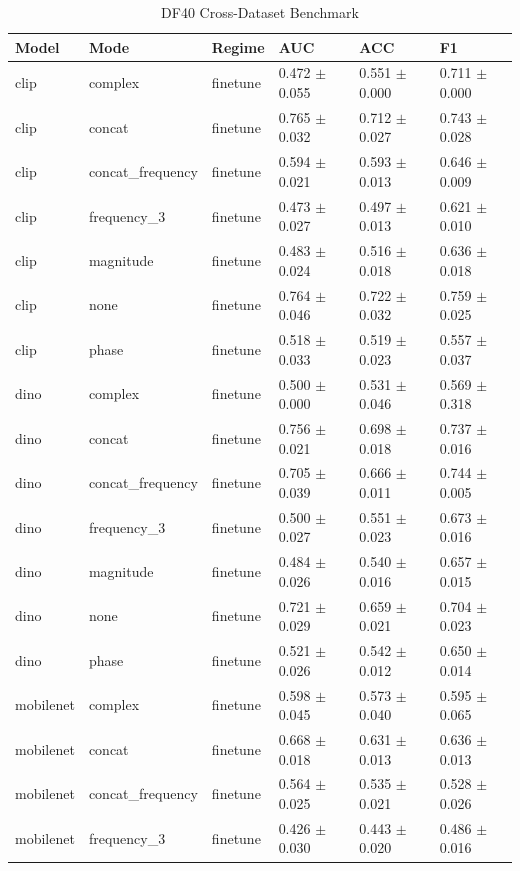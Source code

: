 \begin{table}
\caption{DF40 Cross-Dataset Benchmark}
\label{tab:df40_benchmark}
\begin{tabular}{llllll}
\toprule
Model & Mode & Regime & AUC & ACC & F1 \\
\midrule
clip & complex & finetune & 0.472 $\pm$ 0.055 & 0.551 $\pm$ 0.000 & 0.711 $\pm$ 0.000 \\
clip & concat & finetune & 0.765 $\pm$ 0.032 & 0.712 $\pm$ 0.027 & 0.743 $\pm$ 0.028 \\
clip & concat_frequency & finetune & 0.594 $\pm$ 0.021 & 0.593 $\pm$ 0.013 & 0.646 $\pm$ 0.009 \\
clip & frequency_3 & finetune & 0.473 $\pm$ 0.027 & 0.497 $\pm$ 0.013 & 0.621 $\pm$ 0.010 \\
clip & magnitude & finetune & 0.483 $\pm$ 0.024 & 0.516 $\pm$ 0.018 & 0.636 $\pm$ 0.018 \\
clip & none & finetune & 0.764 $\pm$ 0.046 & 0.722 $\pm$ 0.032 & 0.759 $\pm$ 0.025 \\
clip & phase & finetune & 0.518 $\pm$ 0.033 & 0.519 $\pm$ 0.023 & 0.557 $\pm$ 0.037 \\
dino & complex & finetune & 0.500 $\pm$ 0.000 & 0.531 $\pm$ 0.046 & 0.569 $\pm$ 0.318 \\
dino & concat & finetune & 0.756 $\pm$ 0.021 & 0.698 $\pm$ 0.018 & 0.737 $\pm$ 0.016 \\
dino & concat_frequency & finetune & 0.705 $\pm$ 0.039 & 0.666 $\pm$ 0.011 & 0.744 $\pm$ 0.005 \\
dino & frequency_3 & finetune & 0.500 $\pm$ 0.027 & 0.551 $\pm$ 0.023 & 0.673 $\pm$ 0.016 \\
dino & magnitude & finetune & 0.484 $\pm$ 0.026 & 0.540 $\pm$ 0.016 & 0.657 $\pm$ 0.015 \\
dino & none & finetune & 0.721 $\pm$ 0.029 & 0.659 $\pm$ 0.021 & 0.704 $\pm$ 0.023 \\
dino & phase & finetune & 0.521 $\pm$ 0.026 & 0.542 $\pm$ 0.012 & 0.650 $\pm$ 0.014 \\
mobilenet & complex & finetune & 0.598 $\pm$ 0.045 & 0.573 $\pm$ 0.040 & 0.595 $\pm$ 0.065 \\
mobilenet & concat & finetune & 0.668 $\pm$ 0.018 & 0.631 $\pm$ 0.013 & 0.636 $\pm$ 0.013 \\
mobilenet & concat_frequency & finetune & 0.564 $\pm$ 0.025 & 0.535 $\pm$ 0.021 & 0.528 $\pm$ 0.026 \\
mobilenet & frequency_3 & finetune & 0.426 $\pm$ 0.030 & 0.443 $\pm$ 0.020 & 0.486 $\pm$ 0.016 \\

\end{tabular}
\end{table}
